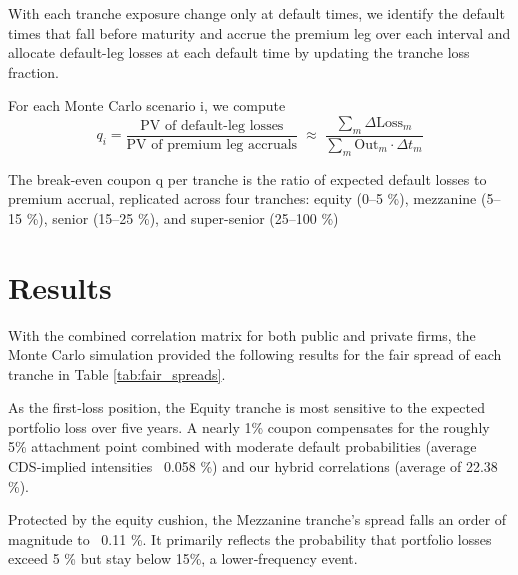 \documentclass[
	a4paper,         %
	12pt,            %
	unnumberedsections,  %
	twoside,         %
]{LTJournalArticle}
\begin{document}
With each tranche exposure change only at default times, we identify the default times that fall before maturity and accrue the premium leg over each interval and allocate default-leg losses at each default time by updating the tranche loss fraction.

For each Monte Carlo scenario i, we compute
$$q_i = \frac{\text{PV of default‐leg losses}}
{\text{PV of premium leg accruals}}
\;\approx\;\frac{\sum_m\Delta\text{Loss}_m}{\sum_m \text{Out}_m \cdot \Delta t_m}$$

The break-even coupon q per tranche is the ratio of expected default losses to premium accrual, replicated across four tranches: equity (0–5 \%), mezzanine (5–15 \%), senior (15–25 \%), and super-senior (25–100 \%)



\section{Results}
With the combined correlation matrix for both public and private firms, the Monte Carlo simulation provided the following results for the fair spread of each tranche in Table \ref{tab:fair_spreads}.

As the first‐loss position, the Equity tranche is most sensitive to the expected portfolio loss over five years. A nearly 1\% coupon compensates for the roughly 5\% attachment point combined with moderate default probabilities (average CDS‐implied intensities ~0.058 \%) and our hybrid correlations (average of 22.38 \%).

\begin{table}[h!]
\centering
{}
\caption{Fair spreads and standard errors by tranche}
\label{tab:fair_spreads}
\end{table}

Protected by the equity cushion, the Mezzanine tranche’s spread falls an order of magnitude to ~0.11 \%. It primarily reflects the probability that portfolio losses exceed 5 \% but stay below 15\%, a lower‐frequency event.
\end{document}
